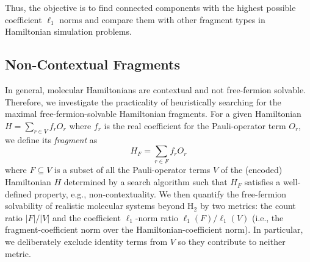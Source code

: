 \documentclass[%
 aip,
 amsmath,amssymb,
 reprint,%
]{revtex4-1}
\newcommand{\coeff}{f}
\newcommand{\lone}[1]{\ell_1(#1)}        %
\begin{document}
Thus, the objective is to find connected components with the highest possible coefficient $\ell_1$ norms and compare them with other fragment types in Hamiltonian simulation problems. \\ 

\subsection{Non-Contextual Fragments}



In general, molecular Hamiltonians are contextual and not free-fermion solvable. Therefore, 
we investigate the practicality of heuristically searching for the maximal free-fermion-solvable Hamiltonian fragments. 
For a given Hamiltonian $H=\sum_{r\in V}\coeff_rO_r$ where $\coeff_r$ is the real coefficient for the Pauli-operator term $O_r$, we define its {\it fragment} as
\begin{equation}
    H_F=\sum_{r\in F}\coeff_rO_r
\end{equation}
where $F\subseteq V$ is a subset of all the Pauli-operator terms $V$ of the (encoded) Hamiltonian $H$ determined by a search algorithm such that $H_F$ satisfies a well-defined property, e.g., non-contextuality. We then quantify the free-fermion solvability of realistic molecular systems beyond H$_2$ by two metrics: the count ratio $|F|/|V|$ and the coefficient $\ell_1$-norm ratio $\lone{F}/\lone{V}$ (i.e., the fragment-coefficient norm over the Hamiltonian-coefficient norm). In particular, we deliberately exclude identity terms from $V$ so they contribute to neither metric.
\end{document}
